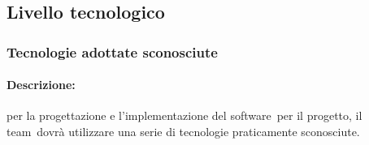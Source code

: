 \documentclass[../PianoProgetto.tex]{subfiles}
\begin{document}
\newpage
\subsection{Livello tecnologico}

\subsubsection{Tecnologie adottate sconosciute}
\label{sec:Tecnologie adottate sconosciute}

	\paragraph*{Descrizione:} per la progettazione e l'implementazione del software\g\ per il progetto, il team\g\ dovrà utilizzare una serie di tecnologie praticamente sconosciute.
	
\end{document}

